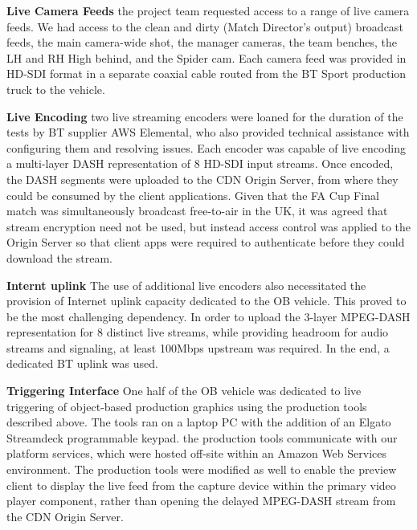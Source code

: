 \documentclass[sigchi-a, authorversion]{acmart}
\begin{document}
\textbf{Live Camera Feeds} the project team requested access to a range of live
camera feeds. We had access to the clean and dirty (Match Director's output)
broadcast feeds, the main camera-wide shot, the manager cameras, the team
benches, the LH and RH High behind, and the Spider cam. Each camera feed was
provided in HD-SDI format in a separate coaxial cable routed from the BT Sport
production truck to the vehicle.

\textbf{Live Encoding} two live streaming encoders were loaned for the duration
of the tests by BT supplier AWS Elemental, who also provided technical assistance
with configuring them and resolving issues. Each encoder was capable of live
encoding a multi-layer DASH representation of 8 HD-SDI input streams. Once
encoded, the DASH segments were uploaded to the CDN Origin Server, from where
they could be consumed by the client applications. Given that the FA Cup Final
match was simultaneously broadcast free-to-air in the UK, it was agreed that
stream encryption need not be used, but instead access control was applied to
the Origin Server so that client apps were required to authenticate before they
could download the stream.

\textbf{Internt uplink} The use of additional live encoders also necessitated
the provision of Internet uplink capacity dedicated to the OB vehicle. This
proved to be the most challenging dependency. In order to upload the 3-layer
MPEG-DASH representation for 8 distinct live streams, while providing headroom
for audio streams and signaling, at least 100Mbps upstream was required. In the
end, a dedicated BT uplink was used.

\textbf{Triggering Interface} One half of the OB vehicle was dedicated to live
triggering of object-based production graphics using the production tools
described above. The tools ran on a laptop PC with the addition of an Elgato
Streamdeck programmable keypad. the production tools communicate with our
platform services, which were hosted off-site within an Amazon Web Services
environment. The production tools were modified as well to enable the preview
client to display the live feed from the capture device within the primary video
player component, rather than opening the delayed MPEG-DASH stream from the CDN
Origin Server.
\end{document}
